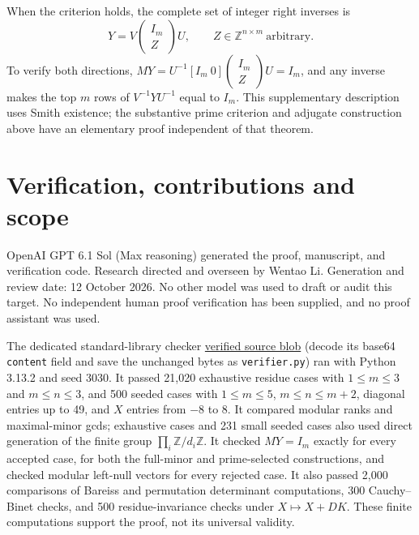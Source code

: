 \documentclass[11pt]{article}
\newcommand{\Z}{\mathbb Z}
\begin{document}
When the criterion holds, the complete set of integer right inverses is
\begin{equation}\label{eq:all}
 Y=V\begin{pmatrix}I_m\\Z\end{pmatrix}U,
 \qquad Z\in\Z^{n\times m}\ \text{arbitrary}.
\end{equation}
To verify both directions, $MY=U^{-1}[I_m\ 0]\begin{pmatrix}I_m\\Z\end{pmatrix}U
=I_m$, and any inverse makes the top $m$ rows of $V^{-1}YU^{-1}$
equal to $I_m$. This supplementary description uses Smith existence;
the substantive prime criterion and adjugate construction above have
an elementary proof independent of that theorem.

\section{Verification, contributions and scope}
OpenAI GPT 6.1 Sol (Max reasoning) generated the proof, manuscript, and
verification code. Research directed and overseen by Wentao Li.
Generation and review date: 12 October 2026. No other model was used
to draft or audit this target. No independent human proof verification
has been supplied, and no proof assistant was used.

The dedicated standard-library checker
\href{https://api.github.com/repos/mehmetmars7/Erdosproblems-llm-hunter/git/blobs/65a35f6767c91a108266d83cdd6f1a932d43336c}{verified source blob} (decode its base64 \texttt{content} field and save the unchanged bytes as \texttt{verifier.py}) ran with
Python 3.13.2 and seed 3030. It passed 21,020 exhaustive residue cases
with $1\le m\le3$ and $m\le n\le3$, and 500 seeded cases with
$1\le m\le5$, $m\le n\le m+2$, diagonal entries up to 49, and $X$
entries from $-8$ to $8$. It compared modular ranks and maximal-minor
gcds; exhaustive cases and 231 small seeded cases also used direct
generation of the finite group $\prod_i\Z/d_i\Z$. It checked
$MY=I_m$ exactly for every accepted case, for both the full-minor and
prime-selected constructions, and checked modular left-null vectors
for every rejected case. It also passed 2,000 comparisons of Bareiss
and permutation determinant computations, 300 Cauchy--Binet checks,
and 500 residue-invariance checks under $X\mapsto X+DK$.
These finite computations support the proof, not its universal validity.
\end{document}
